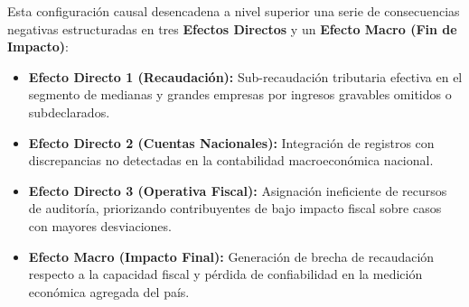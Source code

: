 Esta configuración causal desencadena a nivel superior una serie de consecuencias negativas estructuradas en tres \textbf{Efectos Directos} y un \textbf{Efecto Macro (Fin de Impacto)}:
\begin{itemize}
    \item \textbf{Efecto Directo 1 (Recaudación):} Sub-recaudación tributaria efectiva en el segmento de medianas y grandes empresas por ingresos gravables omitidos o subdeclarados.
    \item \textbf{Efecto Directo 2 (Cuentas Nacionales):} Integración de registros con discrepancias no detectadas en la contabilidad macroeconómica nacional.
    \item \textbf{Efecto Directo 3 (Operativa Fiscal):} Asignación ineficiente de recursos de auditoría, priorizando contribuyentes de bajo impacto fiscal sobre casos con mayores desviaciones.
    \item \textbf{Efecto Macro (Impacto Final):} Generación de brecha de recaudación respecto a la capacidad fiscal y pérdida de confiabilidad en la medición económica agregada del país.
\end{itemize}
